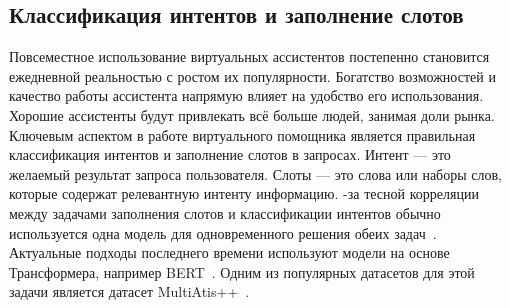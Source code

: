 \subsection{Классификация интентов и заполнение слотов}
Повсеместное использование виртуальных ассистентов постепенно становится ежедневной реальностью с ростом их популярности.
Богатство возможностей и качество работы ассистента напрямую влияет на удобство его использования.
Хорошие ассистенты будут привлекать всё больше людей, занимая доли рынка.
Ключевым аспектом в работе виртуального помощника является правильная классификация интентов и заполнение слотов в запросах.
Интент — это желаемый результат запроса пользователя.
Слоты — это слова или наборы слов, которые содержат релевантную интенту информацию.
-за тесной корреляции между задачами заполнения слотов и классификации интентов обычно используется одна модель для одновременного решения обеих задач~\cite{Weld2021ASO}.
Актуальные подходы последнего времени используют модели на основе Трансформера, например BERT~\cite{devlin-etal-2019-bert}.
Одним из популярных датасетов для этой задачи является датасет MultiAtis++~\cite{Xu2020EndtoEndSA}.

